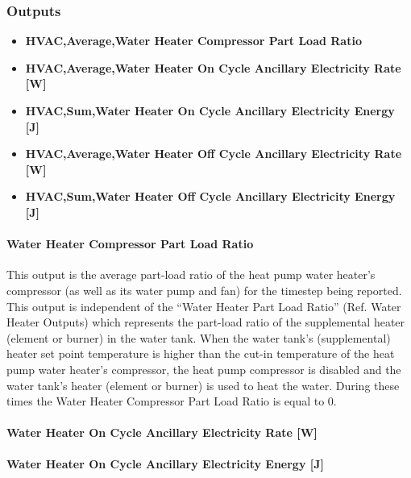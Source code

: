 \subsubsection{Outputs}\label{outputs-3-022}

\begin{itemize}
\item
  \textbf{HVAC,Average,Water Heater Compressor Part Load Ratio}
\item
  \textbf{HVAC,Average,Water Heater On Cycle Ancillary Electricity Rate {[}W{]}}
\item
  \textbf{HVAC,Sum,Water Heater On Cycle Ancillary Electricity Energy {[}J{]}}
\item
  \textbf{HVAC,Average,Water Heater Off Cycle Ancillary Electricity Rate {[}W{]}}
\item
  \textbf{HVAC,Sum,Water Heater Off Cycle Ancillary Electricity Energy {[}J{]}}
\end{itemize}

\paragraph{Water Heater Compressor Part Load Ratio}\label{water-heater-compressor-part-load-ratio-1}

This output is the average part-load ratio of the heat pump water heater's compressor (as well as its water pump and fan) for the timestep being reported. This output is independent of the ``Water Heater Part Load Ratio'' (Ref. Water Heater Outputs) which represents the part-load ratio of the supplemental heater (element or burner) in the water tank. When the water tank's (supplemental) heater set point temperature is higher than the cut-in temperature of the heat pump water heater's compressor, the heat pump compressor is disabled and the water tank's heater (element or burner) is used to heat the water. During these times the Water Heater Compressor Part Load Ratio is equal to 0.

\paragraph{Water Heater On Cycle Ancillary Electricity Rate {[}W{]}}\label{water-heater-on-cycle-ancillary-electric-power-w-1}

\paragraph{Water Heater On Cycle Ancillary Electricity Energy {[}J{]}}\label{water-heater-on-cycle-ancillary-electric-energy-j-1}

